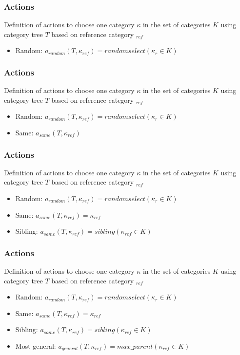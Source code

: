 \documentclass{beamer}
\begin{document}

\begin{frame}
	\frametitle{Actions}
	Definition of actions to choose one category $\kappa$ in the set of categories $K$ using
	category tree $T$ based on reference category $_{ref}$
	\begin{itemize} %
		\item Random: $a_{random} (T,\kappa_{ref}) = random select(\kappa_{r} \in K )$
	\end{itemize}
\end{frame}

\begin{frame}
	\frametitle{Actions}
	Definition of actions to choose one category $\kappa$ in the set of categories $K$ using
	category tree $T$ based on reference category $_{ref}$
	\begin{itemize} %
		\item Random: $a_{random} (T,\kappa_{ref}) = random select(\kappa_{r} \in K )$
		\item Same: $a_{same}(T,\kappa_{ref})$
	\end{itemize}
\end{frame}

\begin{frame}
	\frametitle{Actions}
	Definition of actions to choose one category $\kappa$ in the set of categories $K$ using
	category tree $T$ based on reference category $_{ref}$
	\begin{itemize} %
		\item Random: $a_{random} (T,\kappa_{ref}) = random select(\kappa_{r} \in K )$
		\item Same: $a_{same}(T,\kappa_{ref}) = \kappa_{ref}$
		\item Sibling: $a_{same}(T,\kappa_{ref}) = sibling(\kappa_{ref} \in K)$
	\end{itemize}
\end{frame}

\begin{frame}
	\frametitle{Actions}
	Definition of actions to choose one category $\kappa$ in the set of categories $K$ using
	category tree $T$ based on reference category $_{ref}$
	\begin{itemize} %
		\item Random: $a_{random} (T,\kappa_{ref}) = random select(\kappa_{r} \in K )$
		\item Same: $a_{same}(T,\kappa_{ref}) = \kappa_{ref}$
		\item Sibling: $a_{same}(T,\kappa_{ref}) = sibling(\kappa_{ref} \in K)$
		\item Most general: $a_{general}(T,\kappa_{ref}) = max\_parent(\kappa_{ref} \in K)$
	\end{itemize}
\end{frame}
\end{document}
